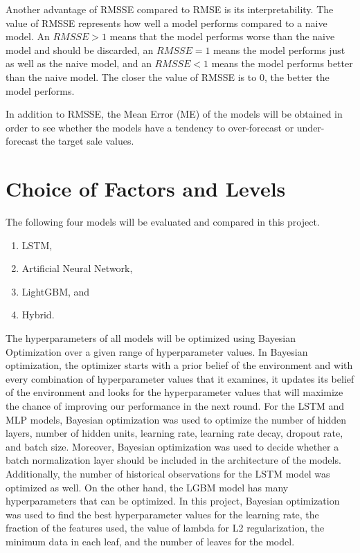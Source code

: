 Another advantage of RMSSE compared to RMSE is its interpretability. 
The value of RMSSE represents how well a model performs compared to a naive model. 
An \(RMSSE > 1\) means that the model performs worse than the naive model and should be discarded, an \(RMSSE = 1\) means the model performs just as well as the naive model, and an \(RMSSE < 1\) means the model performs better than the naive model. 
The closer the value of RMSSE is to 0, the better the model performs.

In addition to RMSSE, the Mean Error (ME) of the models will be obtained in order to see whether the models have a tendency to over-forecast or under-forecast the target sale values.

\section{Choice of Factors and Levels}
The following four models will be evaluated and compared in this project.

\begin{enumerate}
  \item LSTM,
  \item Artificial Neural Network,
  \item LightGBM, and
  \item Hybrid.
\end{enumerate}

The hyperparameters of all models will be optimized using Bayesian Optimization over a given range of hyperparameter values.
In Bayesian optimization, the optimizer starts with a prior belief of the environment and with every combination of hyperparameter values that it examines, it updates its belief of the environment and looks for the hyperparameter values that will maximize the chance of improving our performance in the next round. 
For the LSTM and MLP models, Bayesian optimization was used to optimize the number of hidden layers, number of hidden units, learning rate, learning rate decay, dropout rate, and batch size.
Moreover, Bayesian optimization was used to decide whether a batch normalization layer should be included in the architecture of the models. 
Additionally, the number of historical observations for the LSTM model was optimized as well.
On the other hand, the LGBM model has many hyperparameters that can be optimized. 
In this project, Bayesian optimization was used to find the best hyperparameter values for the learning rate, the fraction of the features used, the value of lambda for L2 regularization, the minimum data in each leaf, and the number of leaves for the model.

